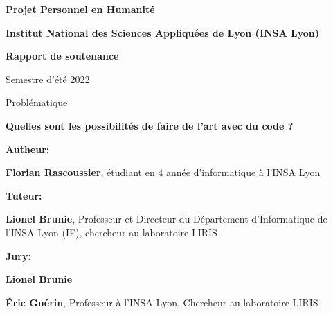 \begin{titlepage}
    \begin{center}
        \vspace{1cm}
        \Large
        \textbf{Projet Personnel en Humanité}

        \vspace{0.5cm}
        \normalsize
        \textbf{Institut National des Sciences Appliquées de Lyon (INSA Lyon)}

        \vspace{2cm}
        \Huge
        \textbf{Rapport de soutenance}

        \normalsize
        Semestre d'été 2022

        \vspace{2cm}
        \Large
        Problématique

        \textbf{Quelles sont les possibilités de faire de l'art avec du code ?}

        \vfill

        \Large
        \textbf{Autheur:} \par
        \normalsize
        \textbf{Florian Rascoussier}, étudiant en 4 année d'informatique à l'INSA Lyon

        \Large
        \textbf{Tuteur:} \par
        \normalsize
        \textbf{Lionel Brunie}, Professeur et Directeur du Département d'Informatique de l'INSA Lyon (IF), chercheur au laboratoire LIRIS

        \Large
        \textbf{Jury:} \par
        \normalsize
        \textbf{Lionel Brunie}

        \textbf{Éric Guérin}, Professeur à l'INSA Lyon, Chercheur au laboratoire LIRIS
            
    \end{center}
\end{titlepage}